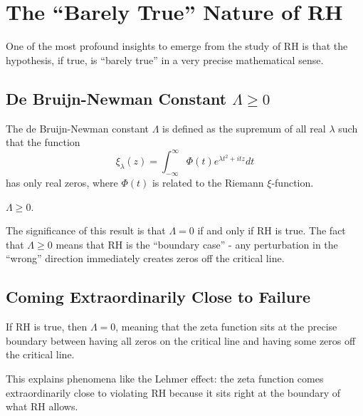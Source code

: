 \section{The ``Barely True'' Nature of RH}
\label{sec:barely_true}

One of the most profound insights to emerge from the study of RH is that the hypothesis, if true, is ``barely true'' in a very precise mathematical sense.

\subsection{De Bruijn-Newman Constant $\Lambda \geq 0$}
\label{subsec:de_bruijn_newman}

\begin{definition}
The de Bruijn-Newman constant $\Lambda$ is defined as the supremum of all real $\lambda$ such that the function
\begin{equation}
\xi_\lambda(z) = \int_{-\infty}^{\infty} \Phi(t) e^{\lambda t^2 + itz} dt
\end{equation}
has only real zeros, where $\Phi(t)$ is related to the Riemann $\xi$-function.
\end{definition}

\begin{theorem}
$\Lambda \geq 0$.
\end{theorem}

The significance of this result is that $\Lambda = 0$ if and only if RH is true. The fact that $\Lambda \geq 0$ means that RH is the ``boundary case'' - any perturbation in the ``wrong'' direction immediately creates zeros off the critical line.

\subsection{Coming Extraordinarily Close to Failure}
\label{subsec:close_to_failure}

\begin{theorem}
If RH is true, then $\Lambda = 0$, meaning that the zeta function sits at the precise boundary between having all zeros on the critical line and having some zeros off the critical line.
\end{theorem}

This explains phenomena like the Lehmer effect: the zeta function comes extraordinarily close to violating RH because it sits right at the boundary of what RH allows.

